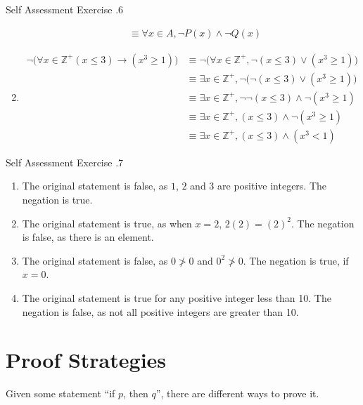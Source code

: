 \documentclass[\main/notes.tex]{subfiles}
\begin{document}
\begin{exercise}{Self Assessment Exercise \thechapter.6}
\begin{enumerate}[label=(\alph*)]
\begin{align*}
							& \equiv \forall x \in A, \lnot P(x) \land \lnot Q(x)
						\end{align*}
					\item {}
						\begin{align*}
							\lnot \bigl(\forall x \in \mathbb{Z}^{+} (x \leq 3) \rightarrow (x^{3} \geq 1)\bigr) &\equiv \lnot \bigl(\forall x \in \mathbb{Z}^{+}, \lnot (x \leq 3) \lor (x^{3} \geq 1)\bigr)\\
							& \equiv \exists x \in \mathbb{Z}^{+}, \lnot \bigl(\lnot (x \leq 3) \lor (x^{3} \geq 1)\bigr)\\
							& \equiv \exists x \in \mathbb{Z}^{+}, \lnot \lnot (x \leq 3) \land \lnot (x^{3} \geq 1)\\
							& \equiv \exists x \in \mathbb{Z}^{+}, (x \leq 3) \land \lnot (x^{3} \geq 1)\\
							& \equiv \exists x \in \mathbb{Z}^{+}, (x \leq 3) \land (x^{3} < 1)
						\end{align*}
				\end{enumerate}
			\end{exercise}
			\pagebreak
			\begin{exercise}{Self Assessment Exercise \thechapter.7}
				\begin{enumerate}[label=(\alph*)]
					\item The original statement is false, as $1$, $2$ and $3$ are positive integers. The negation is true.
					\item The original statement is true, as when $x = 2$, $2(2) = (2)^{2}$. The negation is false, as there is an element.
					\item The original statement is false, as $0 \not > 0$ and $0^{2} \not > 0$. The negation is true, if $x = 0$.
					\item The original statement is true for any positive integer less than 10. The negation is false, as not all positive integers are greater than 10.
				\end{enumerate}
			\end{exercise}
		\section{Proof Strategies}
				Given some statement ``if $p$, then $q$'', there are different ways to prove it.
\end{document}
